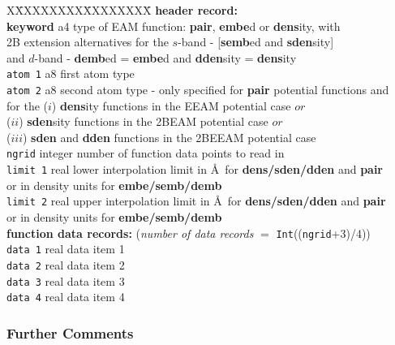 \begin{tabbing}
X\=XXXXXXXX\=XXXXXXXX\=\kill
{\bf header record:}\\
\> {\bf keyword} \> a4      \> type of EAM function: {\bf pair}, {\bf embe}d or {\bf dens}ity, with \\
\>               \>         \> 2B extension alternatives for the $s$-band - [{\bf semb}ed and {\bf sden}sity] \\
\>               \>         \> and $d$-band - {\bf demb}ed = {\bf embe}d and {\bf dden}sity = {\bf dens}ity \\
\> {\tt atom 1}  \> a8      \> first atom type \\
\> {\tt atom 2}  \> a8      \> second atom type - only specified for {\bf pair} potential functions and \\
\>               \>         \> for the ($i$) {\bf dens}ity functions in the EEAM potential case $or$ \\
\>               \>         \> ($ii$) {\bf sden}sity functions in the 2BEAM potential case $or$ \\
\>               \>         \> ($iii$) {\bf sden} and {\bf dden} functions in the 2BEEAM potential case \\
\> {\tt ngrid}   \> integer \> number of function data points to read in \\
\> {\tt limit 1} \> real    \> lower interpolation limit in \AA~for {\bf dens/sden/dden} and {\bf pair} \\
\>               \>         \> or in density units for {\bf embe/semb/demb} \\
\> {\tt limit 2} \> real    \> upper interpolation limit in \AA~for {\bf dens/sden/dden} and {\bf pair} \\
\>               \>         \> or in density units for {\bf embe/semb/demb} \\
{\bf function data records:} ({\em number of data records} $=$ {\tt Int}(({\tt ngrid}+3)/4)) \\
\> {\tt data 1}  \> real    \> data item 1 \\
\> {\tt data 2}  \> real    \> data item 2 \\
\> {\tt data 3}  \> real    \> data item 3 \\
\> {\tt data 4}  \> real    \> data item 4
\end{tabbing}

\subsubsection{Further Comments}

